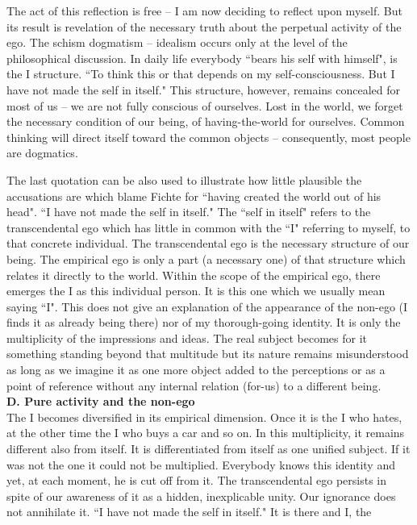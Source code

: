 The act of this reflection is free -- I am now deciding to reflect 
upon myself. But its result is revelation of the necessary truth about the perpetual activity of the ego.
The schism dogmatism -- idealism occurs only at the level of the philosophical discussion. In daily life 
everybody ``bears his self with himself", is the I structure. ``To think this or that depends on my self-consciousness. But I 
have not made the self in itself." \cite{ITS} This structure, however, remains concealed for most of us -- we are not fully 
conscious of ourselves. Lost in the world, we forget the necessary condition of our being, of having-the-world for 
ourselves. Common thinking will direct itself toward the common objects -- consequently,
 most people are dogmatics. 

The last quotation can be also used to illustrate how little plausible the accusations are which blame Fichte for 
``having created the world out of his head". ``I have not made the self in itself." The ``self in itself" refers to the 
transcendental ego which has little in common with the ``I" referring to myself, to that concrete individual. The 
transcendental ego is the necessary structure of our being. The empirical ego is only a part (a necessary one) of that 
structure which relates it directly to the world. Within the scope of the empirical ego, there emerges the I as this 
individual person. It is this one which we usually mean saying ``I". This does not give an explanation of the 
appearance of the non-ego (I finds it as already being there) nor of my thorough-going identity. It is only the 
multiplicity of the impressions and ideas. The real subject becomes for it something standing beyond that 
multitude but its nature remains misunderstood as long as we imagine it as one more object added to the 
perceptions or as a point of reference without any internal relation (for-us) to a 
different being. \\[1ex]
{\bf D. Pure activity and the non-ego } \\ 
The I becomes diversified in its empirical dimension. Once it is the I who hates, at the other time the I who 
buys a car and so on. In this multiplicity, it remains different also from itself. It is differentiated from itself as one 
unified subject. If it was not the one it could not be multiplied. Everybody knows this identity and yet, at each 
moment, he is cut off from it. The transcendental ego persists in spite of our awareness of it as a hidden, 
inexplicable unity. Our ignorance does not annihilate it. ``I have not made the self in itself." It is there and I, the 

